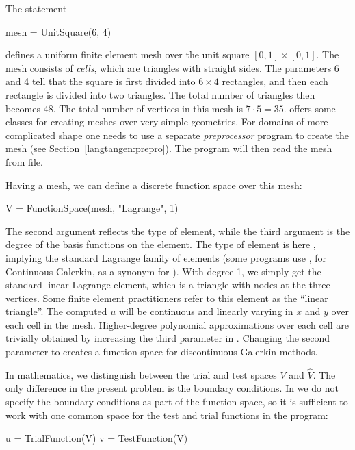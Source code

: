 The statement
\begin{python}
mesh = UnitSquare(6, 4)
\end{python}
defines a uniform finite element mesh over the unit square $[0,1]\times
[0,1]$. The mesh consists of \emph{cells}, which are triangles with
straight sides. The parameters 6 and 4 tell that the square is first
divided into $6\times 4$ rectangles, and then each rectangle is divided
into two triangles. The total number of triangles then becomes 48. The
total number of vertices in this mesh is $7\cdot 5=35$.  \dolfin{} offers
some classes for creating meshes over very simple geometries. For domains
of more complicated shape one needs to use a separate \emph{preprocessor}
program to create the mesh (see Section~\ref{langtangen:prepro}).
The \fenics{} program will then read the
mesh from file.

Having a mesh, we can define a discrete function space  over this
mesh: 
\begin{python}
V = FunctionSpace(mesh, "Lagrange", 1)
\end{python}
The second argument reflects the type of element, while the third
argument is the degree of the basis functions on the element.
The type of element is
here , implying the standard Lagrange family of
elements (some \fenics{} programs use , for Continuous
Galerkin, as a synonym for ).  With degree 1, we
simply get the standard linear Lagrange element, which is a triangle
with nodes at the three vertices.  Some finite element practitioners
refer to this element as the ``linear triangle''.  The computed $u$
will be continuous and linearly varying in $x$ and $y$ over each cell
in the mesh.  Higher-degree polynomial approximations over each cell
are trivially obtained by increasing the third parameter
in . Changing the second parameter to 
creates a function space for discontinuous Galerkin methods.

In mathematics, we distinguish between the trial and test spaces $V$
and $\hat{V}$. The only difference in the present problem is the
boundary conditions. In \fenics{} we do not specify the boundary
conditions as part of the function space, so it is sufficient to work
with one common space  for the test and trial functions in the
program:
\begin{python}
u = TrialFunction(V)
v = TestFunction(V)
\end{python}

